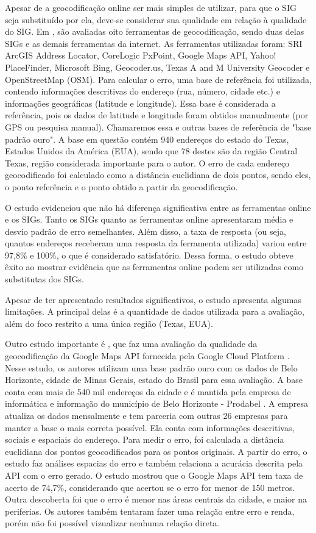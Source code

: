 Apesar de a geocodificação online ser mais simples de utilizar, para que o SIG seja substituído por ela, deve-se considerar sua qualidade em relação à qualidade do SIG. Em \cite{Chow2016}, são avaliadas oito ferramentas de geocodificação, sendo duas delas SIGs e as demais ferramentas da internet. As ferramentas utilizadas foram: SRI ArcGIS Address Locator, CoreLogic PxPoint, Google Maps API, Yahoo! PlaceFinder, Microsoft Bing, Geocoder.us, Texas A and M University Geocoder e OpenStreetMap (OSM). Para calcular o erro, uma base de referência foi utilizada, contendo informações descritivas do endereço (rua, número, cidade etc.) e informações geográficas (latitude e longitude). Essa base é considerada a referência, pois os dados de latitude e longitude foram obtidos manualmente (por GPS ou pesquisa manual). Chamaremos essa e outras bases de referência de "base padrão ouro". A base em questão contém 940 endereços do estado do Texas, Estados Unidos da América (EUA), sendo que 78 destes são da região Central Texas, região considerada importante para o autor. O erro de cada endereço geocodificado foi calculado como a distância euclidiana de dois pontos, sendo eles, o ponto referência e o ponto obtido a partir da geocodificação.

O estudo evidenciou que não há diferença significativa entre as ferramentas online e os SIGs. Tanto os SIGs quanto as ferramentas online apresentaram média e desvio padrão de erro semelhantes. Além disso, a taxa de resposta (ou seja, quantos endereços receberam uma resposta da ferramenta utilizada) variou entre 97,8\% e 100\%, o que é considerado satisfatório. Dessa forma, o estudo obteve êxito ao mostrar evidência que as ferramentas online podem ser utilizadas como substitutas dos SIGs.

Apesar de \cite{Chow2016} ter apresentado resultados significativos, o estudo apresenta algumas limitações. A principal delas é a quantidade de dados utilizada para a avaliação, além do foco restrito a uma única região (Texas, EUA). 

Outro estudo importante é \cite{Clodoveu2011}, que faz uma avaliação da qualidade da geocodificação da Google Maps API fornecida pela Google Cloud Platform \cite{GCP}. Nesse estudo, os autores utilizam uma base padrão ouro com os dados de Belo Horizonte, cidade de Minas Gerais, estado do Brasil para essa avaliação. A base conta com mais de 540 mil endereços da cidade e é mantida pela empresa de informática e informação do município de Belo Horizonte - Prodabel \cite{Prodabel}. A empresa atualiza os dados mensalmente e tem parceria com outras 26 empresas para manter a base o mais correta possível. Ela conta com informações descritivas, sociais e espaciais do endereço. Para medir o erro, foi calculada a distância euclidiana dos pontos geocodificados para os pontos originais. A partir do erro, o estudo faz análises espacias do erro e também relaciona a acurácia descrita pela API com o erro gerado. O estudo mostrou que o Google Maps API tem taxa de acerto de 74,7\%, considerando que acertou se o erro for menor de 150 metros. Outra descoberta foi que o erro é menor nas áreas centrais da cidade, e maior na periferias. Os autores também tentaram fazer uma relação entre erro e renda, porém não foi possível vizualizar nenhuma relação direta.

